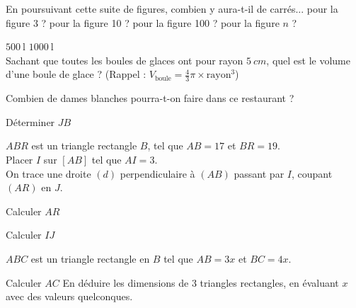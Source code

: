 \documentclass[../Cours.tex]{subfiles}
\begin{document}
\begin{questions}
    En poursuivant cette suite de figures, combien y aura-t-il de carrés...
    \question pour la figure 3 ?
    \question pour la figure 10 ?
    \question pour la figure 100 ?
    \question pour la figure $n$ ?


     $\qty{500}{\litre}$   $\qty{1000}{\litre}$ \\

    \question Sachant que toutes les boules de glaces ont pour rayon $\qty{5}{cm}$, quel est le volume d'une boule de glace ? (Rappel : $V_{\mbox{boule}} = \frac{4}{3} \pi \times \mbox{rayon}^3$)

    
    \question Combien de dames blanches pourra-t-on faire dans ce restaurant ?


    \clearpage


    \begin{center}
    \end{center}

    \question Déterminer $JB$



    $ABR$ est un triangle rectangle $B$, tel que $AB = 17$ et $BR = 19$. \\
    Placer $I$ sur $[AB]$ tel que $AI=3$. \\
    On trace une droite $(d)$ perpendiculaire à $(AB)$ passant par $I$, coupant $(AR)$ en $J$.

    \question Calculer $AR$


    \clearpage
    \question Calculer $IJ$



    $ABC$ est un triangle rectangle en $B$ tel que $AB = 3x$ et $BC = 4x$.

    \question Calculer $AC$
    \question En déduire les dimensions de 3 triangles rectangles, en évaluant $x$ avec des valeurs quelconques.

    
\end{questions}
\end{document}
